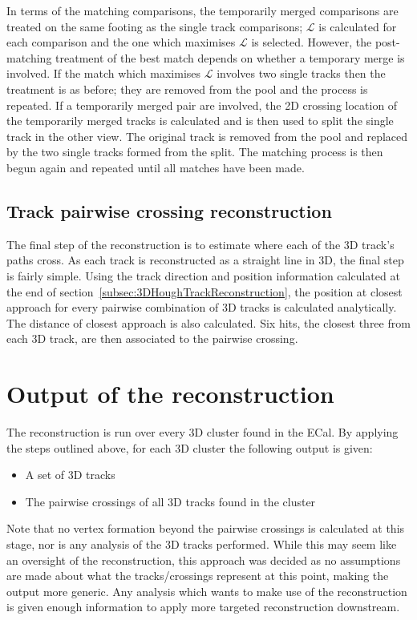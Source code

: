 In terms of the matching comparisons, the temporarily merged comparisons are treated on the same footing as the single track comparisons; $\mathcal{L}$ is calculated for each comparison and the one which maximises $\mathcal{L}$ is selected.  However, the post-matching treatment of the best match depends on whether a temporary merge is involved.  If the match which maximises $\mathcal{L}$ involves two single tracks then the treatment is as before; they are removed from the pool and the process is repeated.  If a temporarily merged pair are involved, the 2D crossing location of the temporarily merged tracks is calculated and is then used to split the single track in the other view.  The original track is removed from the pool and replaced by the two single tracks formed from the split.  The matching process is then begun again and repeated until all matches have been made.

\subsection{Track pairwise crossing reconstruction}
\label{subsec:TrackCrossingReconstruction}
The final step of the reconstruction is to estimate where each of the 3D track's paths cross.  As each track is reconstructed as a straight line in 3D, the final step is fairly simple.  Using the track direction and position information calculated at the end of section~\ref{subsec:3DHoughTrackReconstruction}, the position at closest approach for every pairwise combination of 3D tracks is calculated analytically.  The distance of closest approach is also calculated.  Six hits, the closest three from each 3D track, are then associated to the pairwise crossing. 

\section{Output of the reconstruction}
\label{sec:ReconOutput}
The reconstruction is run over every 3D cluster found in the ECal.  By applying the steps outlined above, for each 3D cluster the following output is given:
\begin{itemize}
  \item A set of 3D tracks
  \item The pairwise crossings of all 3D tracks found in the cluster
\end{itemize}
Note that no vertex formation beyond the pairwise crossings is calculated at this stage, nor is any analysis of the 3D tracks performed.  While this may seem like an oversight of the reconstruction, this approach was decided as no assumptions are made about what the tracks/crossings represent at this point, making the output more generic.  Any analysis which wants to make use of the reconstruction is given enough information to apply more targeted reconstruction downstream. 


